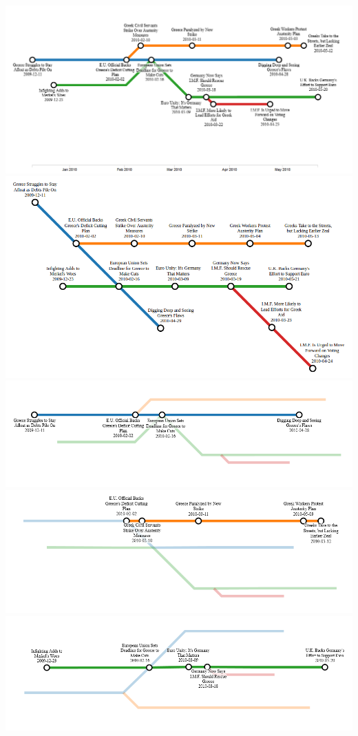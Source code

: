 \documentclass{chi2009}
\begin{document}
\includegraphics[width=\columnwidth]{TimeScaledMap.png}
\includegraphics[width=\columnwidth]{TopologicalMap.png}
\includegraphics[width=\columnwidth]{Metro1.png}
\includegraphics[width=\columnwidth]{Metro2.png}
\includegraphics[width=\columnwidth]{Metro3.png}
\end{document}
